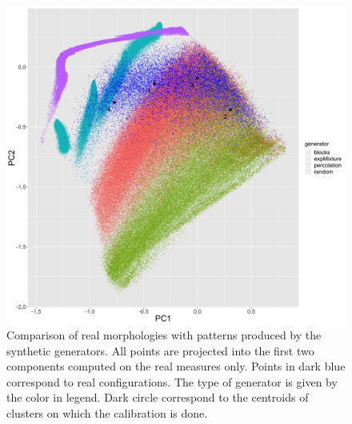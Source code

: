 \documentclass[letterpaper]{article}
\begin{document}
\begin{figure}
    \centering
    \includegraphics[width=\linewidth]{lhscalib_projrealpcs}
    \caption{Comparison of real morphologies with patterns produced by the synthetic generators. All points are projected into the first two components computed on the real measures only. Points in dark blue correspond to real configurations. The type of generator is given by the color in legend. Dark circle correspond to the centroids of clusters on which the calibration is done.}
    \label{fig:lhs}
\end{figure}



\end{document}

